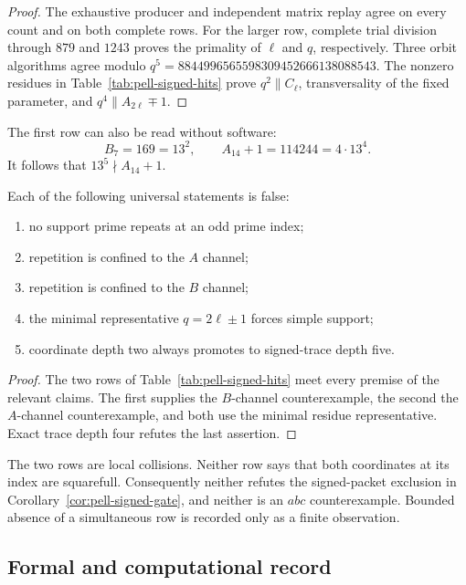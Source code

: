 \begin{proof}
The exhaustive producer and independent matrix replay agree on every
count and on both complete rows.  For the larger row, complete trial
division through $879$ and $1243$ proves the primality of $\ell$ and $q$,
respectively.  Three orbit algorithms agree modulo
$q^5=8844996565598309452666138088543$.  The nonzero residues in
Table~\ref{tab:pell-signed-hits} prove $q^2\parallel C_\ell$, transversality of the
fixed parameter, and $q^4\parallel A_{2\ell}\mp1$.
\end{proof}

The first row can also be read without software:
\[
 B_7=169=13^2,\qquad
 A_{14}+1=114244=4\cdot13^4.
\]
It follows that $13^5\nmid A_{14}+1$.

\begin{corollary}\label{cor:pell-signed-refuted}
Each of the following universal statements is false:
\begin{enumerate}
\item no support prime repeats at an odd prime index;
\item repetition is confined to the $A$ channel;
\item repetition is confined to the $B$ channel;
\item the minimal representative $q=2\ell\pm1$ forces simple support;
\item coordinate depth two always promotes to signed-trace depth five.
\end{enumerate}
\end{corollary}

\begin{proof}
The two rows of Table~\ref{tab:pell-signed-hits} meet every premise of the relevant
claims.  The first supplies the $B$-channel counterexample, the second the
$A$-channel counterexample, and both use the minimal residue
representative.  Exact trace depth four refutes the last assertion.
\end{proof}

\begin{remark}
The two rows are local collisions.  Neither row says that both coordinates
at its index are squarefull.  Consequently neither refutes the
signed-packet exclusion in Corollary~\ref{cor:pell-signed-gate}, and neither is an
$abc$ counterexample.  Bounded absence of a simultaneous row is recorded
only as a finite observation.
\end{remark}

\subsection{Formal and computational record}

